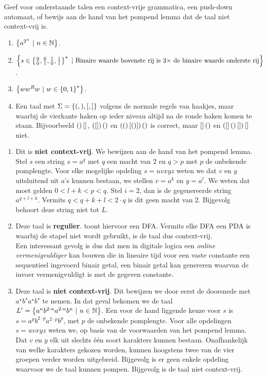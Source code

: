 \documentclass{article}
\begin{document}
\begin{question}
Geef voor onderstaande talen een context-vrije grammatica, een push-down automaat, of bewijs aan de hand van het pompend lemma dat de taal niet context-vrij is.
\begin{enumerate}
 \item $\left\{ a^{2^n}\ |\ n\in\mathbb{N} \right\}$.
 \item $\left\{ s\in\left\{ \tfrac{0}{0},\tfrac{0}{1},\tfrac{1}{0},\tfrac{1}{1} \right\}^{\star}\ |\ \mbox{Binaire waarde bovenste rij is $3\times$ de binaire waarde onderste rij} \right\}$.
 \item $\left\{ ww^Rw\ |\ w\in\left\{ 0,1 \right\}^{\star} \right\}$.
 \item Een taal met $\Sigma=\left\{ (,),[,] \right\}$ volgens de normale regels van haakjes, maar waarbij de vierkante haken op ieder niveau altijd na de ronde haken komen te staan. Bijvoorbeeld $\left(  \right)\left[  \right]$, $\left( \left[  \right] \right){\left(  \right)}$ en $\left( \left(  \right)\left[ \left(  \right) \right] \right)\left(  \right)$ is correct, maar $\left[  \right]\left(  \right)$ en $\left( \left[  \right]\left(  \right)\left[  \right] \right)\left[  \right]$ niet.
\end{enumerate}
\begin{answer}
\begin{enumerate}
 \item Dit is \textbf{niet context-vrij}. We bewijzen aan de hand van het pompend lemma. Stel $s$ een string $s=a^q$ met $q$ een macht van $2$ en $q>p$ met $p$ de onbekende pomplengte. Voor elke mogelijke opdeling $s=uvxyz$ weten we dat $v$ en $y$ uitsluitend uit $a$'s kunnen bestaan, we stellen $v=a^k$ en $y=a^l$. We weten dat moet gelden $0<l+k<p<q$. Stel $i=2$, dan is de gegenereerde string $a^{q+l+k}$. Vermits $q<q+k+l<2\cdot q$ is dit geen macht van $2$. Bijgevolg behoort deze string niet tot $L$.
 \item Deze taal is \textbf{regulier}. toont hiervoor een DFA. Vermits elke DFA een PDA is waarbij de stapel niet wordt gebruikt, is de taal dus context-vrij.\\
 Een interessant gevolg is dus dat men in digitale logica een \emph{online vermenigvuldiger} kan bouwen die in lineaire tijd voor een vaste constante een sequentieel ingevoerd binair getal, een binair getal kan genereren waarvan de invoer vermenigvuldigt is met de gegeven constante.
 \item Deze taal is \textbf{niet context-vrij}. Dit bewijzen we door eerst de doorsnede met $a^{\star}b^{\star}a^{\star}b^{\star}$ te nemen. In dat geval bekomen we de taal $L'=\left\{ a^nb^{2\cdot n}a^{2\cdot n}b^n\ |\ n\in\mathbb{N} \right\}$. Een voor de hand liggende keuze voor $s$ is $s=a^pb^{2\cdot p}a^{2\cdot p}b^p$, met $p$ de onbekende pomplengte. Voor alle opdelingen $s=uvxyz$ weten we, op basis van de voorwaarden van het pompend lemma. Dat $v$ en $y$ elk uit slechts \'e\'en soort karakters kunnen bestaan. Onafhankelijk van welke karakters gekozen worden, kunnen hoogstens twee van de vier groepen verder worden uitgebreid. Bijgevolg is er geen enkele opdeling waarvoor we de taal kunnen pompen. Bijgevolg is de taal niet context-vrij.

\end{enumerate}
\end{answer}
\end{question}
\end{document}
